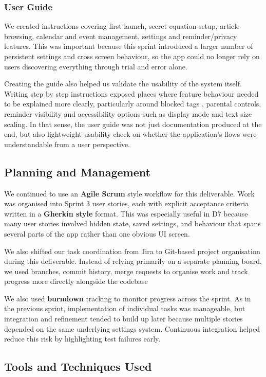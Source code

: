 \documentclass[a4paper, 12pt]{article}
\begin{document}
    \subsubsection{User Guide}
    We created instructions covering first launch, secret equation setup,
    article browsing, calendar and event management, settings and reminder/privacy
    features. This was important because this sprint introduced a larger number of
    persistent settings and cross screen behaviour, so the app could no longer
    rely on users discovering everything through trial and error alone.

    Creating the guide also helped us validate the usability of the system
    itself. Writing step by step instructions exposed places where feature behaviour
    needed to be explained more clearly, particularly around blocked tags ,
    parental controls, reminder visibility and accessibility options such as display
    mode and text size scaling. In that sense, the user guide was not just documentation
    produced at the end, but also lightweight usability check on whether the
    application's flows were understandable from a user perspective.
    \subsection{Planning and Management}
    We continued to use an \textbf{Agile Scrum} style workflow for this
    deliverable. Work was organised into Sprint 3 user stories, each with
    explicit acceptance criteria written in a \textbf{Gherkin style} format.
    This was especially useful in D7 because many user stories involved hidden
    state, saved settings, and behaviour that spans several parts of the app
    rather than one obvious UI screen.

    We also shifted our task coordination from Jira to Git-based project
    organisation during this deliverable. Instead of relying primarily on a separate
    planning board, we used branches, commit history, merge requests to organise
    work and track progress more directly alongside the codebase

    We also used \textbf{burndown} tracking to monitor progress across the
    sprint. As in the previous sprint, implementation of individual tasks was
    manageable, but integration and refinement tended to build up later because multiple
    stories depended on the same underlying settings system. Continuous
    integration helped reduce this risk by highlighting test failures early.
    \subsection{Tools and Techniques Used}
\end{document}
